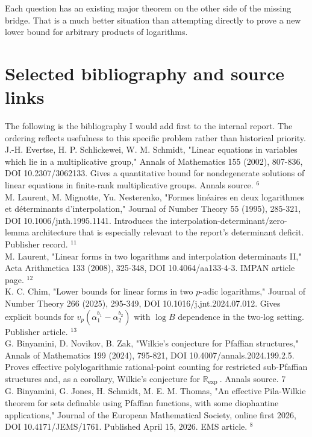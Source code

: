 \documentclass[10pt]{article}
\begin{document}
Each question has an existing major theorem on the other side of the missing bridge. That is a much better situation than attempting directly to prove a new lower bound for arbitrary products of logarithms.

\section*{Selected bibliography and source links}
The following is the bibliography I would add first to the internal report. The ordering reflects usefulness to this specific problem rather than historical priority.\\
J.-H. Evertse, H. P. Schlickewei, W. M. Schmidt, "Linear equations in variables which lie in a multiplicative group," Annals of Mathematics 155 (2002), 807-836, DOI 10.2307/3062133. Gives a quantitative bound for nondegenerate solutions of linear equations in finite-rank multiplicative groups. Annals source. ${ }^{6}$\\
M. Laurent, M. Mignotte, Yu. Nesterenko, "Formes linéaires en deux logarithmes et déterminants d'interpolation," Journal of Number Theory 55 (1995), 285-321, DOI 10.1006/jnth.1995.1141. Introduces the interpolation-determinant/zero-lemma architecture that is especially relevant to the report's determinant deficit. Publisher record. ${ }^{11}$\\
M. Laurent, "Linear forms in two logarithms and interpolation determinants II," Acta Arithmetica 133 (2008), 325-348, DOI 10.4064/aa133-4-3. IMPAN article page. ${ }^{12}$\\
K. C. Chim, "Lower bounds for linear forms in two $p$-adic logarithms," Journal of Number Theory 266 (2025), 295-349, DOI 10.1016/j.jnt.2024.07.012. Gives explicit bounds for $v_{p}\left(\alpha_{1}^{b_{1}}-\alpha_{2}^{b_{2}}\right)$ with $\log B$ dependence in the two-log setting. Publisher article. ${ }^{13}$\\
G. Binyamini, D. Novikov, B. Zak, "Wilkie's conjecture for Pfaffian structures," Annals of Mathematics 199 (2024), 795-821, DOI 10.4007/annals.2024.199.2.5. Proves effective polylogarithmic rational-point counting for restricted sub-Pfaffian structures and, as a corollary, Wilkie's conjecture for $\mathbb{R}_{\text {exp }}$. Annals source. 7\\
G. Binyamini, G. Jones, H. Schmidt, M. E. M. Thomas, "An effective Pila-Wilkie theorem for sets definable using Pfaffian functions, with some diophantine applications," Journal of the European Mathematical Society, online first 2026, DOI 10.4171/JEMS/1761. Published April 15, 2026. EMS article. ${ }^{8}$\\
\end{document}
